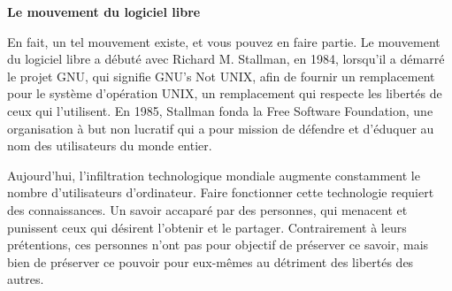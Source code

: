 \documentclass[12pt]{article}
\begin{document}
\begin{center}
{\Large\bf Le mouvement du logiciel libre}
\end{center}

En fait, un tel mouvement existe, et vous pouvez en faire partie. Le mouvement
du logiciel libre a débuté avec Richard M. Stallman, en 1984, lorsqu'il a
démarré le projet GNU, qui signifie \guillemotleft GNU's Not
UNIX\guillemotright, afin de fournir un remplacement pour le système
d'opération UNIX, un remplacement qui respecte les libertés de ceux qui
l'utilisent. En 1985, Stallman fonda la Free Software Foundation, une
organisation à but non lucratif qui a pour mission de défendre et d'éduquer au
nom des utilisateurs du monde entier.


Aujourd'hui, l'infiltration technologique mondiale augmente constamment le nombre
d'utilisateurs d'ordinateur. Faire fonctionner cette
technologie requiert des connaissances. Un savoir accaparé par des personnes,
qui menacent et punissent ceux qui désirent l'obtenir et le partager.
Contrairement à leurs prétentions, ces personnes n'ont pas pour objectif de
préserver ce savoir, mais bien de préserver ce pouvoir pour eux-mêmes au
détriment des libertés des autres.

\end{document}

